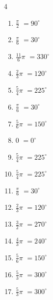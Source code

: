 \begin{multicols}{4}
\begin{enumerate}
  \item $\displaystyle \frac{\pi}{2}$
        $\displaystyle =90^{\circ}$

  \item $\displaystyle \frac{\pi}{6}$
        $\displaystyle =30^{\circ}$

  \item $\displaystyle \frac{11}{6}\pi$
        $\displaystyle =330^{\circ}$

  \item $\displaystyle \frac{2}{3}\pi$
        $\displaystyle =120^{\circ}$

  \item $\displaystyle \frac{5}{4}\pi$
        $\displaystyle =225^{\circ}$

  \item $\displaystyle \frac{\pi}{6}$
        $\displaystyle =30^{\circ}$

  \item $\displaystyle \frac{5}{6}\pi$
        $\displaystyle =150^{\circ}$

  \item $\displaystyle 0$
        $\displaystyle =0^{\circ}$

  \item $\displaystyle \frac{5}{4}\pi$
        $\displaystyle =225^{\circ}$

  \item $\displaystyle \frac{5}{4}\pi$
        $\displaystyle =225^{\circ}$

  \item $\displaystyle \frac{\pi}{6}$
        $\displaystyle =30^{\circ}$

  \item $\displaystyle \frac{2}{3}\pi$
        $\displaystyle =120^{\circ}$

  \item $\displaystyle \frac{3}{2}\pi$
        $\displaystyle =270^{\circ}$

  \item $\displaystyle \frac{4}{3}\pi$
        $\displaystyle =240^{\circ}$

  \item $\displaystyle \frac{5}{6}\pi$
        $\displaystyle =150^{\circ}$

  \item $\displaystyle \frac{5}{3}\pi$
        $\displaystyle =300^{\circ}$

  \item $\displaystyle \frac{5}{3}\pi$
        $\displaystyle =300^{\circ}$


\end{enumerate}
\end{multicols}
